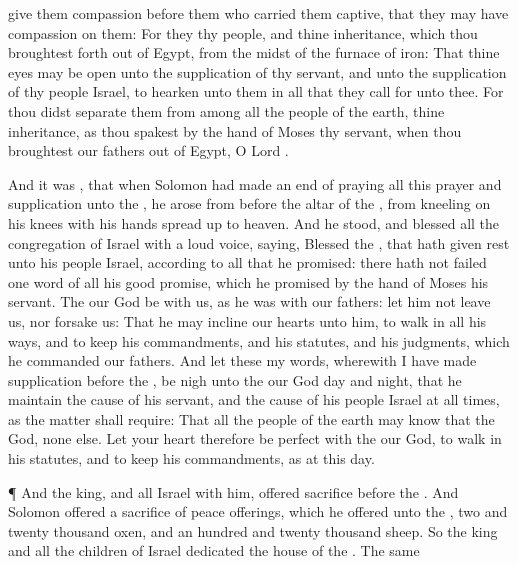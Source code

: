 {give them
compassion
before them who carried them
captive, that they may have
compassion on them:
For they
{} thy
people, and thine
inheritance, which thou broughtest
forth out of
Egypt, from the
midst of the
furnace of
iron:
That thine
eyes may be
open unto the
supplication of thy
servant, and unto the
supplication of thy
people
Israel, to
hearken unto them in all that they
call for unto thee.
For thou didst
separate them from among all the
people of the
earth,
{} thine
inheritance, as thou
spakest by the
hand of
Moses thy
servant, when thou
broughtest our
fathers out of
Egypt, O
Lord
{}.
\par }{\PP {}And it was
{}, that when
Solomon had made an
end of
praying all this
prayer and
supplication unto the
{}, he
arose from
before the
altar of the
{}, from
kneeling on his
knees with his
hands spread
up to
heaven.
And he
stood, and
blessed all the
congregation of
Israel with a
loud
voice,
saying,
Blessed
{} the
{}, that hath
given
rest unto his
people
Israel, according to all that he
promised: there hath not
failed
one
word of all his
good
promise, which he
promised by the
hand of
Moses his
servant.
The
{} our
God be with us, as he was with our
fathers: let him not
leave us, nor
forsake us:
That he may
incline our
hearts unto him, to
walk in all his
ways, and to
keep his
commandments, and his
statutes, and his
judgments, which he
commanded our
fathers.
And let these my
words, wherewith I have made
supplication
before the
{}, be
nigh unto the
{} our
God
day and
night, that he
maintain the
cause of his
servant, and the
cause of his
people
Israel at all
times, as the
matter shall require:
That all the
people of the
earth may
know that the
{}
{}
God,
{} none else.
Let your
heart therefore be
perfect with the
{} our
God, to
walk in his
statutes, and to
keep his
commandments, as at this
day.
\par }{\PP {}¶ And the
king, and all
Israel with him,
offered
sacrifice
before the
{}.
And
Solomon
offered a
sacrifice of peace
offerings, which he
offered unto the
{},
two and
twenty
thousand
oxen, and an
hundred and
twenty
thousand
sheep. So the
king and all the
children of
Israel
dedicated the
house of the
{}.
The same
}
